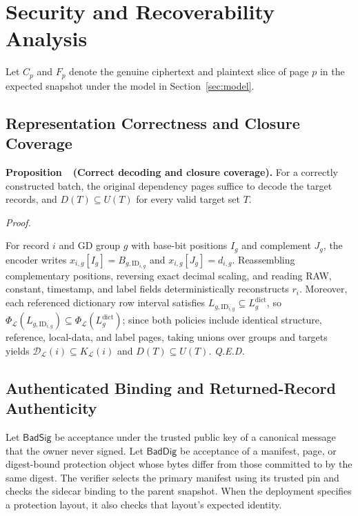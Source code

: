 \documentclass[10pt,journal]{IEEEtran}
\newcounter{proposition}
\newenvironment{proposition}[1]{%
  \refstepcounter{proposition}\par\smallskip\noindent
  \textbf{Proposition~\theproposition\ (#1). }\ignorespaces
}{\par\smallskip}
\newenvironment{claimproof}{\par\noindent\emph{Proof. }\ignorespaces
}{\hfill\textit{Q.E.D.}\par\smallskip}
\begin{document}
\section{Security and Recoverability Analysis}\label{sec:security}
Let $C_p$ and $F_p$ denote the genuine ciphertext and plaintext slice of page $p$ in the expected snapshot under the model in Section~\ref{sec:model}.

\subsection{Representation Correctness and Closure Coverage}\label{sec:representation-proof}\label{sec:closure-proof}
\begin{proposition}{Correct decoding and closure coverage}\label{prop:representation}\label{prop:closure}
For a correctly constructed batch, the original dependency pages suffice to decode the target records, and $D(T)\subseteq U(T)$ for every valid target set $T$.
\end{proposition}
\begin{claimproof}
For record $i$ and GD group $g$ with base-bit positions $I_g$ and complement $J_g$, the encoder writes $x_{i,g}[I_g]=B_{g,\mathrm{ID}_{i,g}}$ and $x_{i,g}[J_g]=d_{i,g}$. Reassembling complementary positions, reversing exact decimal scaling, and reading RAW, constant, timestamp, and label fields deterministically reconstructs $r_i$. Moreover, each referenced dictionary row interval satisfies $L_{g,\mathrm{ID}_{i,g}}\subseteq L_g^{\mathrm{dict}}$, so $\Phi_{\mathcal L}(L_{g,\mathrm{ID}_{i,g}})\subseteq\Phi_{\mathcal L}(L_g^{\mathrm{dict}})$; since both policies include identical structure, reference, local-data, and label pages, taking unions over groups and targets yields $\mathcal D_{\mathcal L}(i)\subseteq K_{\mathcal L}(i)$ and $D(T)\subseteq U(T)$.
\end{claimproof}

\subsection{Authenticated Binding and Returned-Record Authenticity}\label{sec:binding}\label{sec:conditional}
Let $\mathsf{BadSig}$ be acceptance under the trusted public key of a canonical message that the owner never signed. Let $\mathsf{BadDig}$ be acceptance of a manifest, page, or digest-bound protection object whose bytes differ from those committed to by the same digest. The verifier selects the primary manifest using its trusted pin and checks the sidecar binding to the parent snapshot. When the deployment specifies a protection layout, it also checks that layout's expected identity.
\end{document}
